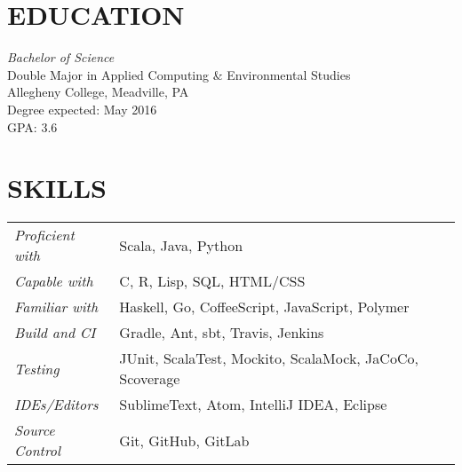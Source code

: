 \documentclass[margin]{res}
\begin{document}
 
 
 
\address{990 First St,\\ Meadville, PA, 16335  \\
        +1 (814) 853-1501}
\address{hawk@meteorcodelabs.com \\ weismanm@allegheny.edu \\ \url{http://hawkw.github.io}}

 
\begin{resume} 
 

\section{EDUCATION} {\sl Bachelor of Science} \\
                Double Major in Applied Computing \& Environmental Studies \\
                Allegheny College, Meadville, PA \\
                Degree expected: May 2016 \\
                GPA: 3.6
 
\section{SKILLS}
   \begin{tabular}{l p{3in}}
                \textit{Proficient with} & Scala, Java, Python \\
                \textit{Capable with} & C, R, Lisp, SQL, HTML/CSS \\
                \textit{Familiar with} & Haskell, Go, CoffeeScript, JavaScript, Polymer \\
   	            \textit{Build and CI}  & Gradle, Ant, sbt, Travis, Jenkins \\
                \textit{Testing}  & JUnit, ScalaTest, Mockito, ScalaMock, JaCoCo, Scoverage \\
                \textit{IDEs/Editors}  & SublimeText, Atom, IntelliJ IDEA, Eclipse \\
                \textit{Source Control} &Git, GitHub, GitLab
 \end{tabular}



\end{resume}
\end{document}
